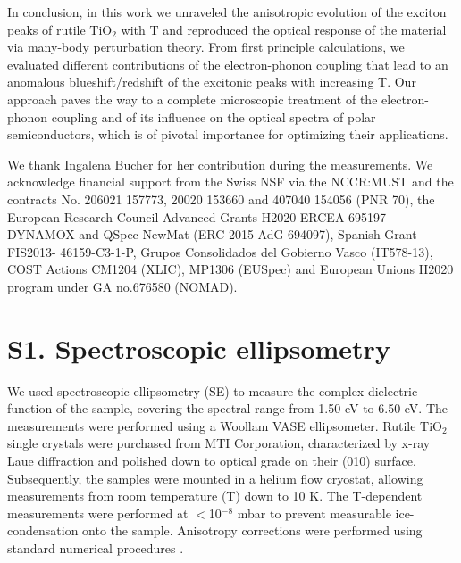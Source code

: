 \documentclass[aps,prl,twocolumn,amsfonts,nobibnotes,superscriptaddress,showpacs]{revtex4-1}
\begin{document}
In conclusion, in this work we unraveled the anisotropic evolution of the exciton peaks of rutile TiO$_2$ with T and reproduced the optical response of the material via many-body perturbation theory. From first principle calculations, we evaluated different contributions of the electron-phonon coupling that lead to an anomalous blueshift/redshift of the excitonic peaks with increasing T. Our approach paves the way to a complete microscopic treatment of the electron-phonon coupling and of its influence on the optical spectra of polar semiconductors, which is of pivotal importance for optimizing their applications.

\begin{acknowledgments}
We thank Ingalena Bucher for her contribution during the measurements. We acknowledge financial support from the Swiss NSF via the NCCR:MUST and the contracts No. 206021 157773, 20020 153660 and 407040 154056 (PNR 70), the European Research Council Advanced Grants H2020 ERCEA 695197 DYNAMOX and QSpec-NewMat (ERC-2015-AdG-694097), Spanish Grant FIS2013- 46159-C3-1-P, Grupos Consolidados del Gobierno Vasco (IT578-13), COST Actions CM1204 (XLIC), MP1306 (EUSpec) and European Unions H2020 program under GA no.676580 (NOMAD).
\end{acknowledgments}

\newpage

\clearpage
\newpage

\setcounter{section}{0}
\setcounter{figure}{0}
\renewcommand{\thesection}{S\arabic{section}}  
\renewcommand{\thetable}{S\arabic{table}}  
\renewcommand{\thefigure}{S\arabic{figure}} 
\renewcommand\Im{\operatorname{\mathfrak{Im}}}



\section{S1. Spectroscopic ellipsometry}

We used spectroscopic ellipsometry (SE) to measure the complex dielectric function of the sample, covering the spectral range from 1.50 eV to 6.50 eV. The measurements were performed using a Woollam VASE ellipsometer. Rutile TiO$_2$ single crystals were purchased from MTI Corporation, characterized by x-ray Laue diffraction and polished down to optical grade on their (010) surface. Subsequently, the samples were mounted in a helium flow cryostat, allowing measurements from room temperature (T) down to 10 K. The T-dependent measurements were performed at $<$10$^{-8}$ mbar to prevent measurable ice-condensation onto the sample. Anisotropy corrections were performed using standard numerical procedures \cite{ref:aspnes}.
\end{document}
